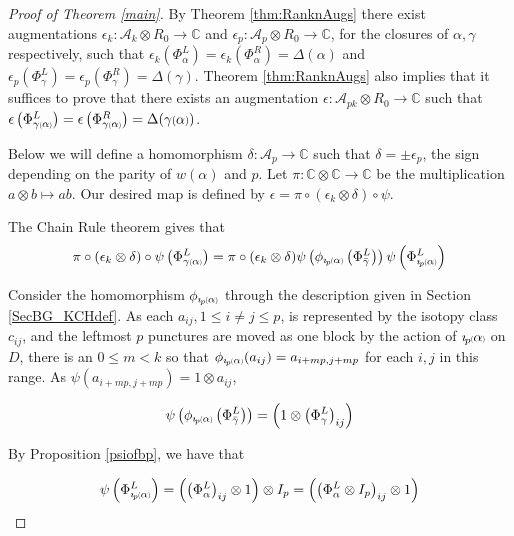 \documentclass[11pt]{amsart}
\def\C{{\mathbb C}}
\def\A{{\mathcal A}}
\newcommand*{\smallp}[1]{\scalebox{.75}{\ensuremath#1}}
\newcommand*{\subsmallp}[1]{\scalebox{.5}{\ensuremath#1}}
\newcommand{\subpp}[2][p]{\imath_{\hspace*{-1pt}#1}\hspace*{-.5pt}\subsmallp(#2\subsmallp)}
\theoremstyle{definition}
\begin{document}
\begin{proof}[Proof of Theorem \ref{main}]
By Theorem \ref{thm:RanknAugs} there exist augmentations $\epsilon_k\colon \A_k\otimes R_0 \rightarrow \C$ and $\epsilon_p\colon \A_p\otimes R_0 \rightarrow \C$, for the closures of $\alpha,\gamma$ respectively, such that $\epsilon_k\left(\Phi_\alpha^L\right) = \epsilon_k\left(\Phi_\alpha^R\right) = \Delta(\alpha)$ and $\epsilon_p\left(\Phi_{\gamma}^L\right) = \epsilon_p\left(\Phi_{\gamma}^R\right) = \Delta(\gamma)$. Theorem \ref{thm:RanknAugs} also implies that it suffices to prove that there exists an augmentation $\epsilon\colon \A_{pk}\otimes R_0\rightarrow \C$ such that $\epsilon\left(\Phi_{\gamma\subsmallp(\alpha\subsmallp)}^L\right) = \epsilon\left(\Phi_{\gamma\subsmallp(\alpha\subsmallp)}^R\right) = \Delta(\gamma\smallp(\alpha\smallp))$.

Below we will define a homomorphism $\delta\colon\A_p\rightarrow \C$ such that $\delta = \pm \epsilon_p$, the sign depending on the parity of $w(\alpha)$ and $p$. Let $\pi\colon \C\otimes \C \rightarrow \C$ be the multiplication $a\otimes b\mapsto ab$. Our desired map is defined by $\epsilon = \pi\circ(\epsilon_k\otimes\delta)\circ\psi$.

The Chain Rule theorem gives that
\begin{equation}
\pi\circ(\epsilon_k\otimes\delta)\circ\psi\left(\Phi_{\gamma\subsmallp(\alpha\subsmallp)}^L\right) = \pi\circ(\epsilon_k\otimes\delta)\psi\left(\phi_{\subpp\alpha}\left(\Phi_{\bar\gamma}^L\right)\right)\psi\left(\Phi_{\subpp\alpha}^L\right)
\label{eqn1MainPf}
\end{equation}

Consider the homomorphism $\phi_{\subpp\alpha}$ through the description given in Section \ref{SecBG_KCHdef}. As each $a_{ij}, 1\le i\ne j\le p$, is represented by the isotopy class $c_{ij}$, and the leftmost $p$ punctures are moved as one block by the action of $\subpp\alpha$ on $D$, there is an $0\le m<k$ so that $\phi_{\subpp\alpha}(a_{ij})=a_{i+mp,j+mp}$ for each $i,j$ in this range. As $\psi(a_{i + mp, j+mp})=1\otimes a_{ij}$,

$$\psi\left(\phi_{\subpp\alpha}\left(\Phi_{\bar\gamma}^L\right)\right) = \left(1\otimes \left(\Phi_{\gamma}^L\right)_{ij}\right)$$

\noindent By Proposition \ref{psiofbp}, we have that 

$$\psi\left(\Phi_{\subpp\alpha}^L\right) = \left(\left(\Phi_\alpha^L\right)_{ij}\otimes 1\right)\otimes I_p = \left(\left(\Phi_\alpha^L\otimes I_p\right)_{ij}\otimes 1\right)$$


\end{proof}
\end{document}
